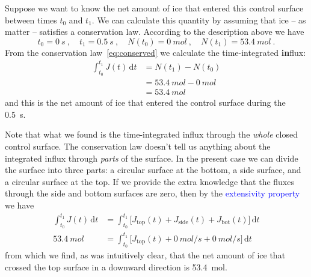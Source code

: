 \documentclass[a4paper,12pt,%
onecolumn,oneside,%
british%
]{memoir}
\newcommand*{\di}{\mathrm{d}}%
\renewcommand*{\|}[1][]{\nonscript\:#1\vert\nonscript\:\mathopen{}}
\newcommand*{\sect}{\S}%
\renewcommand*{\autoref}[2]{\sidepar{\vspace{-1ex}\footnotesize{\color{blue}\faIcon{%
angle-right%
}\enskip\sect~\ref{#1} page~\pageref{#1}}}\textcolor{blue}{#2}}
\newcommand*{\yti}{t_{0}}
\newcommand*{\ytf}{t_{1}}
\newcommand*{\yN}{N}
\newcommand*{\yJ}{J}
\begin{document}
Suppose we want to know the net amount of ice that entered this control surface between times $\yti$ and $\ytf$. We can calculate this quantity by assuming that ice -- as matter -- satisfies a conservation law.
According to the description above we have
\begin{equation*}
  \yti=\qty{0}{s} \ ,\quad
  \ytf=\qty{0.5}{s} \ ,\quad
  \yN(\yti)=\qty{0}{mol} \ ,\quad
  \yN(\ytf)=\qty{53.4}{mol} \ .
\end{equation*}
From the conservation law~\eqref{eq:conserved} we calculate the time-integrated \textbf{in}flux:
\begin{equation*}
  \begin{split}
    \int_{\yti}^{\ytf}\!\!\yJ(t)\,\di t &= \yN(\ytf) - \yN(\yti)
    \\&= \qty{53.4}{mol} - \qty{0}{mol}
    \\&= \qty{53.4}{mol}
  \end{split}
\end{equation*}
and this is the net amount of ice that entered the control surface during the \qty{0.5}{s}.

Note that what we found is the time-integrated influx through the \emph{whole} closed control surface. The conservation law doesn't tell us anything about the integrated influx through \emph{parts} of the surface. In the present case we can divide the surface into three parts: a circular surface at the bottom, a side surface, and a circular surface at the top. If we provide the extra knowledge that the fluxes through the side and bottom surfaces are zero, then by the \autoref{def:extensivity}{extensivity property} we have
\begin{equation*}
  \begin{split}
    \int_{\yti}^{\ytf}\!\!\yJ(t)\,\di t &=
    \int_{\yti}^{\ytf}\!\bigl[\yJ_{\text{top}}(t) +
    \yJ_{\text{side}}(t) +
    \yJ_{\text{bot}}(t)\bigr]\,\di t
    \\
      \qty{53.4}{mol} &=
      \int_{\yti}^{\ytf}\!\bigl[\yJ_{\text{top}}(t) +
      \qty{0}{mol/s} +
      \qty{0}{mol/s}\bigr]\,\di t
  \end{split}
\end{equation*}
from which we find, as was intuitively clear, that the net amount of ice that crossed the top surface in a downward direction is \qty{53.4}{mol}.


\bigskip
\end{document}
